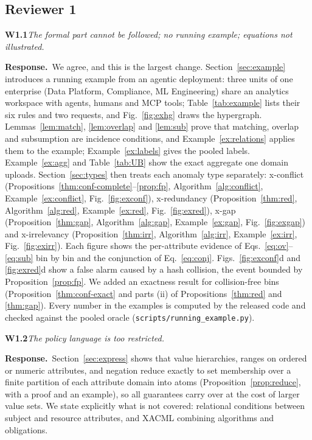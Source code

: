 \documentclass[11pt,a4paper]{article}
\newcommand{\concern}[2]{\medskip\noindent\textbf{#1}\quad\emph{#2}\par\smallskip}
\newcommand{\resp}{\noindent\textcolor{blue!55!black}{\textbf{Response.}}\ }
\begin{document}
\subsection*{Reviewer 1}
\concern{W1.1}{The formal part cannot be followed; no running example; equations not illustrated.}
\resp We agree, and this is the largest change. Section~\ref{sec:example} introduces a running example from an agentic deployment: three units of one enterprise (Data Platform, Compliance, ML Engineering) share an analytics workspace with agents, humans and MCP tools; Table~\ref{tab:example} lists their six rules and two requests, and Fig.~\ref{fig:exhg} draws the hypergraph. Lemmas~\ref{lem:match}, \ref{lem:overlap} and \ref{lem:sub} prove that matching, overlap and subsumption are incidence conditions, and Example~\ref{ex:relations} applies them to the example; Example~\ref{ex:labels} gives the pooled labels. Example~\ref{ex:agg} and Table~\ref{tab:UB} show the exact aggregate one domain uploads. Section~\ref{sec:types} then treats each anomaly type separately: x-conflict (Propositions~\ref{thm:conf-complete}--\ref{prop:fp}, Algorithm~\ref{alg:conflict}, Example~\ref{ex:conflict}, Fig.~\ref{fig:exconf}), x-redundancy (Proposition~\ref{thm:red}, Algorithm~\ref{alg:red}, Example~\ref{ex:red}, Fig.~\ref{fig:exred}), x-gap (Proposition~\ref{thm:gap}, Algorithm~\ref{alg:gap}, Example~\ref{ex:gap}, Fig.~\ref{fig:exgap}) and x-irrelevancy (Proposition~\ref{thm:irr}, Algorithm~\ref{alg:irr}, Example~\ref{ex:irr}, Fig.~\ref{fig:exirr}). Each figure shows the per-attribute evidence of Eqs.~\eqref{eq:ov}--\eqref{eq:sub} bin by bin and the conjunction of Eq.~\eqref{eq:conj}. Figs.~\ref{fig:exconf}d and \ref{fig:exred}d show a false alarm caused by a hash collision, the event bounded by Proposition~\ref{prop:fp}. We added an exactness result for collision-free bins (Proposition~\ref{thm:conf-exact} and parts (ii) of Propositions~\ref{thm:red} and \ref{thm:gap}). Every number in the examples is computed by the released code and checked against the pooled oracle (\texttt{scripts/running\_example.py}).

\concern{W1.2}{The policy language is too restricted.}
\resp Section~\ref{sec:express} shows that value hierarchies, ranges on ordered or numeric attributes, and negation reduce exactly to set membership over a finite partition of each attribute domain into atoms (Proposition~\ref{prop:reduce}, with a proof and an example), so all guarantees carry over at the cost of larger value sets. We state explicitly what is not covered: relational conditions between subject and resource attributes, and XACML combining algorithms and obligations.
\end{document}
